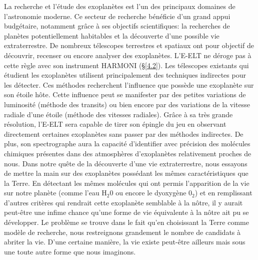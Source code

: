La recherche et l'étude des exoplanètes est l'un des principaux domaines de l'astronomie moderne. Ce secteur de recherche bénéficie d'un grand appui budgétaire, notamment grâce à ses objectifs scientifiques: la recherches de planètes potentiellement habitables et la découverte d'une possible vie extraterrestre. De nombreux télescopes terrestres et spatiaux ont pour objectif de découvrir, recenser ou encore analyser des exoplanètes. L'E-ELT ne déroge pas à cette règle avec son instrument HARMONI (§\ref{4.2}). Les télescopes existants qui étudient les exoplanètes utilisent principalement des techniques indirectes pour les détecter. Ces méthodes recherchent l'influence que possède une exoplanète sur son étoile hôte. Cette influence peut se manifester par des petites variations de luminosité (méthode des transits) ou bien encore par des variations de la vitesse radiale d'une étoile (méthode des vitesses radiales). Grâce à sa très grande résolution, l'E-ELT sera capable de tirer son épingle du jeu en observant directement certaines exoplanètes sans passer par des méthodes indirectes. De plus, son spectrographe aura la capacité d'identifier avec précision des molécules chimiques présentes dans des atmosphères d'exoplanètes relativement proches de nous. Dans notre quête de la découverte d'une vie extraterrestre, nous essayons de mettre la main sur des exoplanètes possédant les mêmes caractéristiques que la Terre. En détectant les mêmes molécules qui ont permis l'apparition de la vie sur notre planète (comme l'eau H$_{2} 0$ ou encore le dyoxygène $0_{2}$) et en remplissant d'autres critères qui rendrait cette exoplanète semblable à la nôtre, il y aurait peut-être une infime chance qu'une forme de vie équivalente à la nôtre ait pu se développer. Le problème se trouve dans le fait qu'en choisissant la Terre comme modèle de recherche, nous restreignons grandement le nombre de candidats à abriter la vie. D'une certaine manière, la vie existe peut-être ailleurs mais sous une toute autre forme que nous imaginons.










